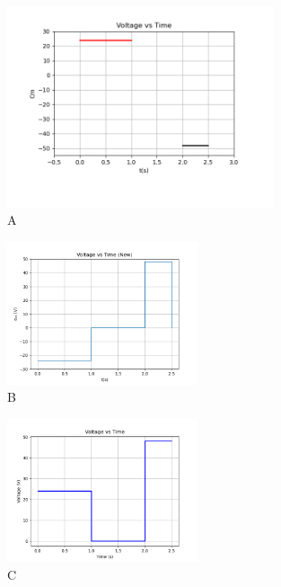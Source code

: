     \begin{figure}[h!]
    \centering
      \hspace{-1cm}
      \includegraphics[width=0.7\textwidth]{figs/Figure_6.png}
      \caption{A}
      \label{fig:your_label}
    \end{figure}

   \begin{figure}[h!]
    \centering
      \hspace{-1cm}
      \includegraphics[width=0.5\textwidth]{figs/Figure_7.png}
      \caption{B}
      \label{fig:your_label}
    \end{figure}

    \begin{figure}[h!]
    \centering
      \hspace{-1cm}
      \includegraphics[width=0.5\textwidth]{figs/Figure_8.png}
      \caption{C}
      \label{fig:your_label}
    \end{figure}

